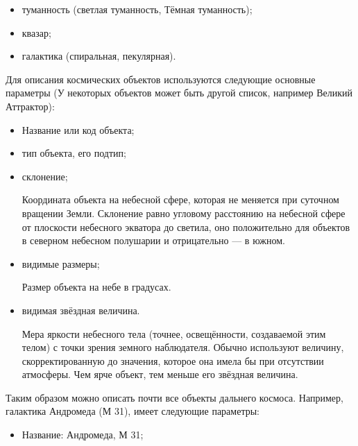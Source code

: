 \documentclass[14pt]{extreport}
\begin{document}
{\begin{itemize}
            \item туманность (светлая туманность, Тёмная туманность);
            
            \item квазар;
            
            \item галактика (спиральная, пекулярная).
            
        \end{itemize}

        Для описания космических объектов используются следующие основные параметры (У некоторых объектов может быть другой список, например Великий Аттрактор):

        \begin{itemize}
            \item Название или код объекта;
        
            \item тип объекта, его подтип;
            
            \item склонение;
            
            Координата объекта на небесной сфере, которая не меняется при суточном вращении Земли. Склонение равно угловому расстоянию на небесной сфере от плоскости небесного экватора до светила, оно положительно для объектов в северном небесном полушарии и отрицательно — в южном.   
            
            \item видимые размеры;

            Размер объекта на небе в градусах.
            
            \item видимая звёздная величина.

            Мера яркости небесного тела (точнее, освещённости, создаваемой этим телом) с точки зрения земного наблюдателя. Обычно используют величину, скорректированную до значения, которое она имела бы при отсутствии атмосферы. Чем ярче объект, тем меньше его звёздная величина.
        \end{itemize}

        Таким образом можно описать почти все объекты дальнего космоса. Например, галактика Андромеда (М 31), имеет следующие параметры:

        \begin{itemize}
        
            \item Название: Андромеда, М 31;


\end{itemize}}
\end{document}
